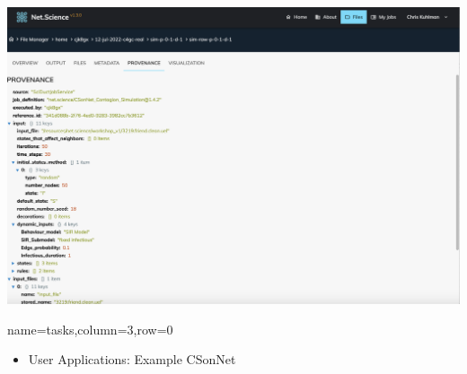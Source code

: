 \documentclass[landscape,paperwidth=70in,paperheight=46in,fontscale=0.225]{baposter} %
\begin{document}
\begin{poster}
{\begin{minipage}{0.3\linewidth}
\includegraphics[trim = 0in 0in 10in 0in, clip, scale=0.08]{figures/provenance.png}
\end{minipage}


}

          {name=tasks,column=3,row=0}{


\begin{itemize}[leftmargin=*,noitemsep,topsep=0pt]
\item User Applications:  Example CSonNet
\end{itemize}

}
\end{poster}
\end{document}
